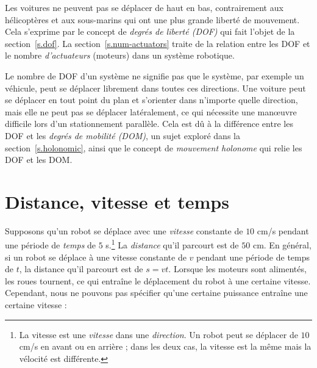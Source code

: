 Les voitures ne peuvent pas se déplacer de haut en bas, contrairement aux hélicoptères et aux sous-marins qui ont une plus grande liberté de mouvement. Cela s'exprime par le concept de \emph{degrés de liberté (DOF)} qui fait l'objet de la section~\ref{s.dof}. La section~\ref{s.num-actuators} traite de la relation entre les DOF et le nombre \emph{d'actuateurs} (moteurs) dans un système robotique.

Le nombre de DOF d'un système ne signifie pas que le système, par exemple un véhicule, peut se déplacer librement dans toutes ces directions. Une voiture peut se déplacer en tout point du plan et s'orienter dans n'importe quelle direction, mais elle ne peut pas se déplacer latéralement, ce qui nécessite une manœuvre difficile lors d'un stationnement parallèle. Cela est dû à la différence entre les DOF et les \emph{degrés de mobilité (DOM)}, un sujet exploré dans la section~\ref{s.holonomic}, ainsi que le concept de \emph{mouvement holonome} qui relie les DOF et les DOM.

\section{Distance, vitesse et temps}\label{s.distance-vitesse}

Supposons qu'un robot se déplace avec une \emph{vitesse} constante de $10$ cm/s pendant une période de \emph{temps} de $5$ s.\footnote{La vitesse est une \emph{vitesse} dans une \emph{direction}. Un robot peut se déplacer de $10$ cm/s en avant ou en arrière ; dans les deux cas, la vitesse est la même mais la vélocité est différente.} La \emph{distance} qu'il parcourt est de $50$ cm. En général, si un robot se déplace à une vitesse constante de $v$ pendant une période de temps de $t$, la distance qu'il parcourt est de $s=vt$. Lorsque les moteurs sont alimentés, les roues tournent, ce qui entraîne le déplacement du robot à une certaine vitesse. Cependant, nous ne pouvons pas spécifier qu'une certaine puissance entraîne une certaine vitesse :

